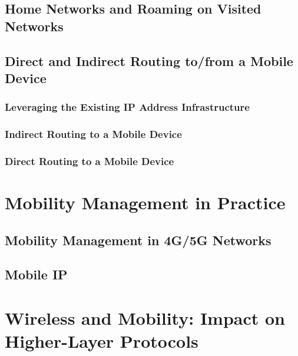 \documentclass[12pt letter]{report}
\begin{document}
\section{Home Networks and Roaming on Visited Networks}

\section{Direct and Indirect Routing to/from a Mobile Device}

\subsection{Leveraging the Existing IP Address Infrastructure}

\subsection{Indirect Routing to a Mobile Device}

\subsection{Direct Routing to a Mobile Device}

\chapter{Mobility Management in Practice}

\section{Mobility Management in 4G/5G Networks}

\section{Mobile IP}

\chapter{Wireless and Mobility: Impact on Higher-Layer Protocols}
\end{document}
